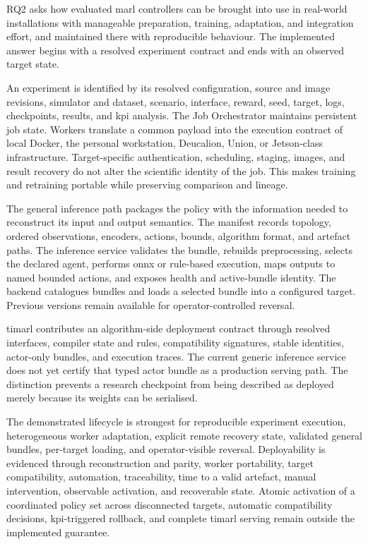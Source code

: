 RQ2 asks how evaluated \gls{marl} controllers can be brought into use in real-world installations with manageable preparation, training, adaptation, and integration effort, and maintained there with reproducible behaviour. The implemented answer begins with a resolved experiment contract and ends with an observed target state.

An experiment is identified by its resolved configuration, source and image revisions, simulator and dataset, scenario, interface, reward, seed, target, logs, checkpoints, results, and \gls{kpi} analysis. The Job Orchestrator maintains persistent job state. Workers translate a common payload into the execution contract of local Docker, the personal workstation, Deucalion, Union, or Jetson-class infrastructure. Target-specific authentication, scheduling, staging, images, and result recovery do not alter the scientific identity of the job. This makes training and retraining portable while preserving comparison and lineage.

The general inference path packages the policy with the information needed to reconstruct its input and output semantics. The manifest records topology, ordered observations, encoders, actions, bounds, algorithm format, and artefact paths. The inference service validates the bundle, rebuilds preprocessing, selects the declared agent, performs \gls{onnx} or rule-based execution, maps outputs to named bounded actions, and exposes health and active-bundle identity. The backend catalogues bundles and loads a selected bundle into a configured target. Previous versions remain available for operator-controlled reversal.

\gls{timarl} contributes an algorithm-side deployment contract through resolved interfaces, compiler state and rules, compatibility signatures, stable identities, actor-only bundles, and execution traces. The current generic inference service does not yet certify that typed actor bundle as a production serving path. The distinction prevents a research checkpoint from being described as deployed merely because its weights can be serialised.

The demonstrated lifecycle is strongest for reproducible experiment execution, heterogeneous worker adaptation, explicit remote recovery state, validated general bundles, per-target loading, and operator-visible reversal. Deployability is evidenced through reconstruction and parity, worker portability, target compatibility, automation, traceability, time to a valid artefact, manual intervention, observable activation, and recoverable state. Atomic activation of a coordinated policy set across disconnected targets, automatic compatibility decisions, \gls{kpi}-triggered rollback, and complete \gls{timarl} serving remain outside the implemented guarantee.

